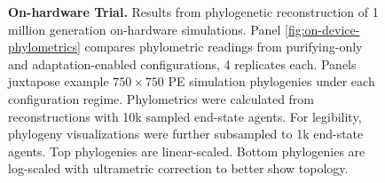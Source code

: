 \begin{figure}
\vspace{-1.5ex}

\caption{%
\textbf{On-hardware Trial.}
\footnotesize
Results from phylogenetic reconstruction of 1 million generation on-hardware simulations.
Panel \ref{fig:on-device-phylometrics} compares phylometric readings from purifying-only and adaptation-enabled configurations, 4 replicates each.
Panels  juxtapose example $750\times750$ PE simulation phylogenies under each configuration regime.
Phylometrics were calculated from reconstructions with 10k sampled end-state agents.
For legibility, phylogeny visualizations were further subsampled to 1k end-state agents.
Top phylogenies are linear-scaled.
Bottom phylogenies are log-scaled with ultrametric correction to better show topology.
}
\label{fig:on-device}
\vspace{-0.2in}
\end{figure}
